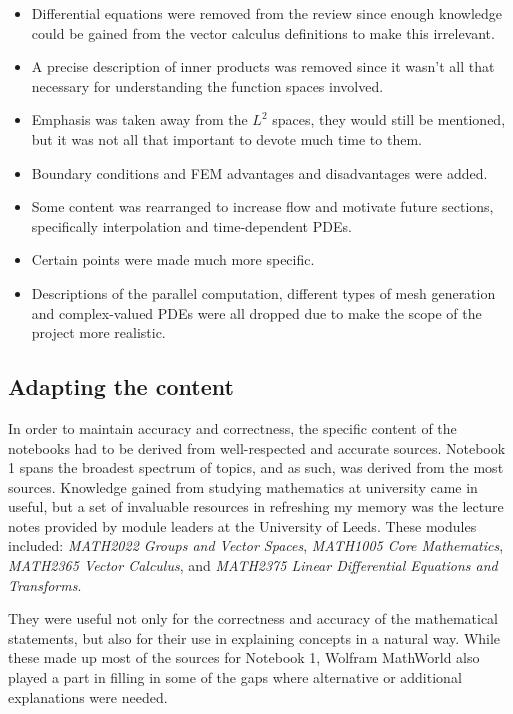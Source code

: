 \begin{itemize}
    \item Differential equations were removed from the review since enough knowledge could be gained from the vector calculus definitions to make this irrelevant.
    \item A precise description of inner products was removed since it wasn't all that necessary for understanding the function spaces involved.
    \item Emphasis was taken away from the $L^2$ spaces, they would still be mentioned, but it was not all that important to devote much time to them.
    \item Boundary conditions and FEM advantages and disadvantages were added.
    \item Some content was rearranged to increase flow and motivate future sections, specifically interpolation and time-dependent PDEs.
    \item Certain points were made much more specific.
    \item Descriptions of the parallel computation, different types of mesh generation and complex-valued PDEs were all dropped due to make the scope of the project more realistic.
\end{itemize}

\subsection{Adapting the content} \label{subsection:adapting-the-content}

In order to maintain accuracy and correctness, the specific content of the notebooks had to be derived from well-respected and accurate sources. Notebook 1 spans the broadest spectrum of topics, and as such, was derived from the most sources. Knowledge gained from studying mathematics at university came in useful, but a set of invaluable resources in refreshing my memory was the lecture notes provided by module leaders at the University of Leeds. These modules included: {\em MATH2022 Groups and Vector Spaces}, {\em MATH1005 Core Mathematics}, {\em MATH2365 Vector Calculus}, and {\em MATH2375 Linear Differential Equations and Transforms}.

They were useful not only for the correctness and accuracy of the mathematical statements, but also for their use in explaining concepts in a natural way. While these made up most of the sources for Notebook 1, Wolfram MathWorld \cite{wolfram-mathworld} also played a part in filling in some of the gaps where alternative or additional explanations were needed.

